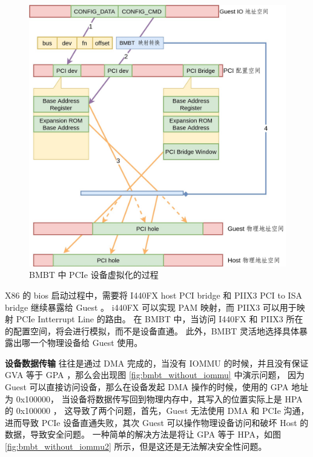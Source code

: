 \begin{figure}[!htbp]
	\centering
	\includegraphics[width=1.0\textwidth]{./images/PCIe.jpg}
	\caption{BMBT 中 PCIe 设备虚拟化的过程}
	\label{fig:PCIe}
\end{figure}

X86 的 bios 启动过程中，需要将 I440FX host PCI bridge 和 PIIX3 PCI to ISA bridge 继续暴露给 Guest 。
i440FX 可以实现 PAM 映射，而 PIIX3 可以用于映射 PCIe Intterrupt Line 的路由。
在 BMBT 中，当访问 I440FX 和 PIIX3 所在的配置空间，将会进行模拟，而不是设备直通。
此外，BMBT 灵活地选择具体暴露出哪一个物理设备给 Guest 使用。

\textbf{设备数据传输} 往往是通过 DMA 完成的，当没有 IOMMU 的时候，并且没有保证 GVA 等于 GPA ，那么会出现图 \ref{fig:bmbt_without_iommu} 中演示问题，
因为 Guest 可以直接访问设备，那么在设备发起 DMA 操作的时候，使用的 GPA 地址为 0x100000，
当设备将数据传写回到物理内存中，其写入的位置实际上是 HPA 的 0x100000 ，
这导致了两个问题，首先，Guest 无法使用 DMA 和 PCIe 沟通，进而导致 PCIe 设备直通失败，其次 Guest 可以操作物理设备访问和破坏 Host 的数据，导致安全问题。
一种简单的解决方法是将让 GPA 等于 HPA，如图 \ref{fig:bmbt_without_iommu2} 所示，但是这还是无法解决安全性问题。

